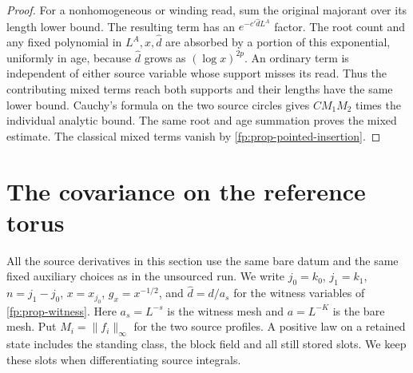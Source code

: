 \documentclass[11pt,letterpaper,reqno]{amsart}
\numberwithin{equation}{section}
\theoremstyle{definition}
\theoremstyle{remark}
\begin{document}
\begin{proof}
For a nonhomogeneous or winding read, sum the original
majorant over its length lower bound. The resulting term
has an \(e^{-c'\widehat d L^A}\) factor. The root count and
any fixed polynomial in \(L^A,x,\widehat d\) are absorbed
by a portion of this exponential, uniformly in age, because
\(\widehat d\) grows as \((\log x)^{2p}\).
An ordinary term is independent of either source variable whose
support misses its read. Thus the contributing mixed terms reach
both supports and their lengths have the same lower bound.
Cauchy's formula on the two source circles gives \(C M_1M_2\)
times the individual analytic bound. The same root and age
summation proves the mixed estimate. The classical mixed
terms vanish by \cref{fp:prop-pointed-insertion}.
\end{proof}


\section{The covariance on the reference torus}
\label{fp:sec-reference-comparison}

All the source derivatives in this section use the same bare datum and
the same fixed auxiliary choices as in the unsourced run. We write
$j_0=k_0$, $j_1=k_1$, $n=j_1-j_0$, $x=x_{j_0}$, $g_x=x^{-1/2}$,
and $\widehat d=d/a_s$ for the witness variables of
\cref{fp:prop-witness}. Here $a_s=L^{-s}$ is the witness mesh and
$a=L^{-K}$ is the bare mesh. Put $M_i=\|f_i\|_\infty$ for the two
source profiles. A positive law on a retained state includes the
standing class, the block field and all still stored slots. We keep
these slots when differentiating source integrals.
\end{document}
